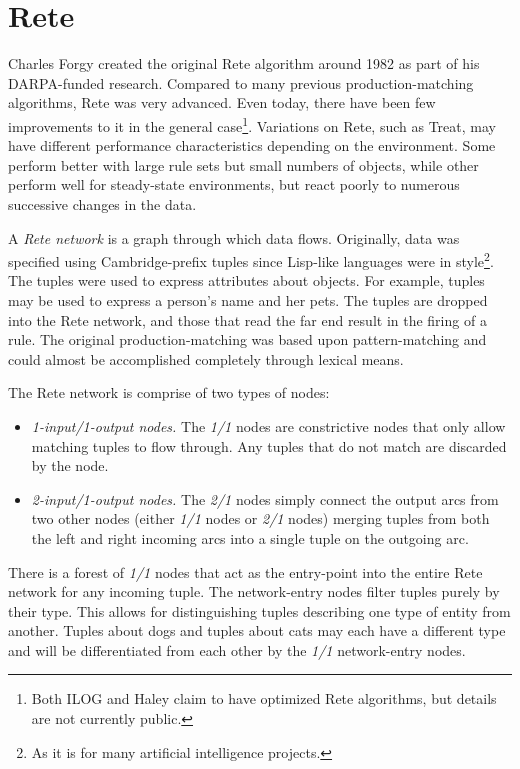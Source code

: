 \section{Rete}
\label{algo.rete}

Charles Forgy created the original Rete algorithm\cite{forgy82rete} 
around 1982 as part
of his DARPA-funded research.  Compared to many previous
production-matching algorithms, Rete was very advanced.  Even today,
there have been few improvements to it in the general
case\footnote{Both ILOG and Haley claim to have optimized Rete
algorithms, but details are not currently public.}.  Variations on 
Rete, such as Treat, may have different performance characteristics
depending on the environment.  Some perform better with large rule 
sets but small numbers of objects, while other perform well for 
steady-state environments, but react poorly to numerous successive 
changes in the data.

A \emph{Rete network} is a graph through which data flows.
Originally, data was specified using Cambridge-prefix tuples since
Lisp-like languages were in style\footnote{As it is for many artificial
intelligence projects.}.  The tuples were used to express attributes
about objects.  For example, tuples may be used to express a person's
name and her pets.  The tuples are dropped into the Rete network,
and those that read the far end result in the firing of a rule.
The original production-matching was based upon pattern-matching and
could almost be accomplished completely through lexical means.

The Rete network is comprise of two types of nodes:

\begin{itemize}
	\item \emph{1-input/1-output nodes.}  The \emph{1/1} nodes are
		constrictive nodes that only allow matching tuples to
		flow through.  Any tuples that do not match are discarded
		by the node.
	\item \emph{2-input/1-output nodes.}
		The \emph{2/1} nodes simply connect the output arcs from two
		other nodes (either \emph{1/1} nodes or \emph{2/1} nodes) merging
		tuples from both the left and right incoming arcs
		into a single tuple on the outgoing arc.
\end{itemize}

There is a forest of \emph{1/1} nodes that act as the entry-point
into the entire Rete network for any incoming tuple.  The
network-entry  nodes filter tuples purely by their type.  
This allows for distinguishing tuples describing one type of 
entity from another.  Tuples about dogs and tuples about cats may 
each have a different type and will be differentiated from each 
other by the \emph{1/1} network-entry nodes.


